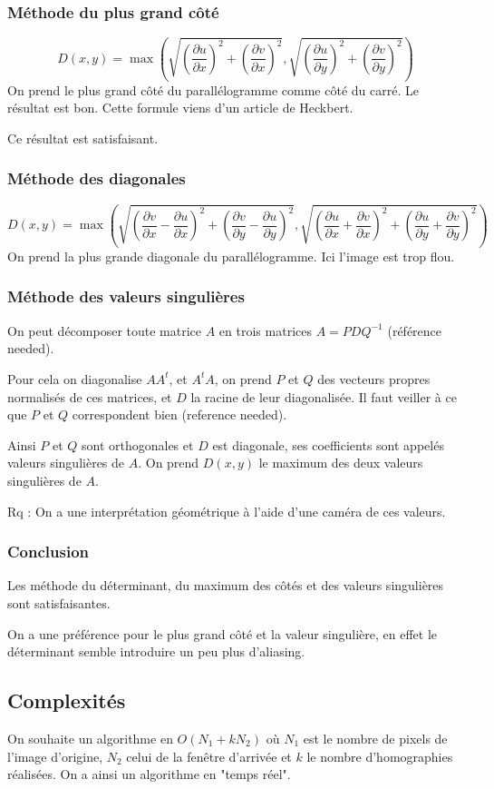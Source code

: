 \documentclass{article}
\newcommand{\sse}[1]{\medbreak \subsection*{#1}}
\newcommand{\ssse}[1]{\subsubsection*{#1}}
\newcommand{\dr}[0]{\partial}
\begin{document}

\ssse{Méthode du plus grand côté}
$$ D(x,y) = \max (\sqrt{(\frac{\dr u}{\dr x})^2 + (\frac{\dr v}{\dr x})^2},\sqrt{(\frac{\dr u}{\dr y})^2 + (\frac{\dr v}{\dr y})^2})$$
On prend le plus grand côté du parallélogramme comme côté du carré. Le résultat est bon. Cette formule viens d'un article de Heckbert.

Ce résultat est satisfaisant.


\ssse{Méthode des diagonales}
$$D(x,y) = \max \left( \sqrt{(\frac{\dr v}{\dr x}-\frac{\dr  u}{\dr  x})^2+(\frac{\dr v}{\dr y}-\frac{\dr  u}{\dr y})^2}, \sqrt{(\frac{\dr u}{\dr x}+\frac{\dr  v}{\dr  x})^2+(\frac{\dr u}{\dr y}+\frac{\dr  v}{\dr  y})^2} \right)$$
On prend la plus grande diagonale du parallélogramme. Ici l'image est trop flou.


\ssse{Méthode des valeurs singulières}

On peut décomposer toute matrice $A$ en trois matrices $A = PDQ^{-1}$ (référence needed).

Pour cela on diagonalise $AA^t$, et $A^tA$, on prend $P$ et $Q$ des vecteurs propres normalisés de ces matrices, et $D$ la racine de leur diagonalisée. Il faut veiller à ce que $P$ et $Q$ correspondent bien (reference needed).

Ainsi $P$ et $Q$ sont orthogonales et $D$ est diagonale, ses coefficients sont appelés valeurs singulières de $A$. On prend $D(x,y)$ le maximum des deux valeurs singulières de $A$.

Rq : On a une interprétation géométrique à l'aide d'une caméra de ces valeurs.

\ssse{Conclusion}

Les méthode du déterminant, du maximum des côtés et des valeurs singulières sont satisfaisantes.

On a une préférence pour le plus grand côté et la valeur singulière, en effet le déterminant semble introduire un peu plus d'aliasing. 

\sse{Complexités}

On souhaite un algorithme en $O(N_1 + k N_2)$ où $N_1$ est le nombre de pixels de l'image d'origine, $N_2$ celui de la fenêtre d'arrivée et $k$ le nombre d'homographies réalisées. On a ainsi un algorithme en "temps réel".
\end{document}
